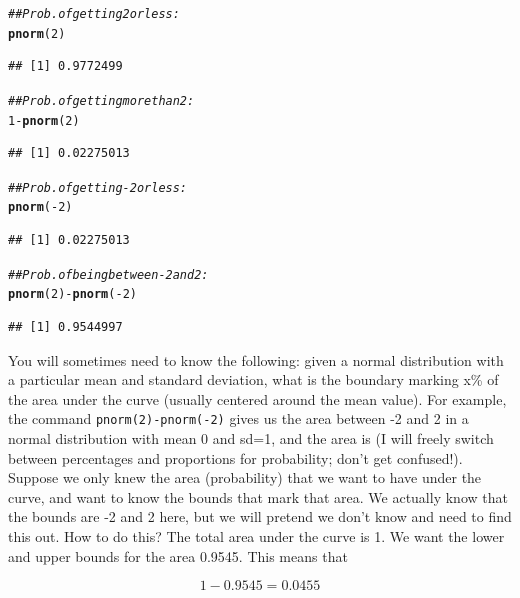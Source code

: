 \documentclass[12pt]{book}\usepackage[]{graphicx}\usepackage[]{color}
\makeatletter
\newcommand{\hlnum}[1]{\textcolor[rgb]{0.686,0.059,0.569}{#1}}%
\newcommand{\hlcom}[1]{\textcolor[rgb]{0.678,0.584,0.686}{\textit{#1}}}%
\newcommand{\hlopt}[1]{\textcolor[rgb]{0,0,0}{#1}}%
\newcommand{\hlstd}[1]{\textcolor[rgb]{0.345,0.345,0.345}{#1}}%
\newcommand{\hlkwd}[1]{\textcolor[rgb]{0.737,0.353,0.396}{\textbf{#1}}}%
\newenvironment{kframe}{%
 \def\at@end@of@kframe{}%
 \ifinner\ifhmode%
  \def\at@end@of@kframe{\end{minipage}}%
  \begin{minipage}{\columnwidth}%
 \fi\fi%
 \def\FrameCommand##1{\hskip\@totalleftmargin \hskip-\fboxsep
 \colorbox{shadecolor}{##1}\hskip-\fboxsep
     \hskip-\linewidth \hskip-\@totalleftmargin \hskip\columnwidth}%
 \MakeFramed {\advance\hsize-\width
   \@totalleftmargin\z@ \linewidth\hsize
   \@setminipage}}%
 {\par\unskip\endMakeFramed%
 \at@end@of@kframe}
\newenvironment{knitrout}{}{} %
\makeatother
\begin{document}
\begin{knitrout}
\color{fgcolor}\begin{kframe}
\begin{alltt}
\hlcom{## Prob. of getting 2 or less:}
\hlkwd{pnorm}\hlstd{(}\hlnum{2}\hlstd{)}
\end{alltt}
\begin{verbatim}
## [1] 0.9772499
\end{verbatim}
\begin{alltt}
\hlcom{## Prob. of getting more than 2:}
\hlnum{1}\hlopt{-}\hlkwd{pnorm}\hlstd{(}\hlnum{2}\hlstd{)}
\end{alltt}
\begin{verbatim}
## [1] 0.02275013
\end{verbatim}
\begin{alltt}
\hlcom{## Prob. of getting -2 or less:}
\hlkwd{pnorm}\hlstd{(}\hlopt{-}\hlnum{2}\hlstd{)}
\end{alltt}
\begin{verbatim}
## [1] 0.02275013
\end{verbatim}
\begin{alltt}
\hlcom{## Prob. of being between -2 and 2:}
\hlkwd{pnorm}\hlstd{(}\hlnum{2}\hlstd{)}\hlopt{-}\hlkwd{pnorm}\hlstd{(}\hlopt{-}\hlnum{2}\hlstd{)}
\end{alltt}
\begin{verbatim}
## [1] 0.9544997
\end{verbatim}
\end{kframe}
\end{knitrout}

You will sometimes need to know the following: given a normal distribution with a particular mean and standard deviation, what is the boundary marking x\% of the area under the curve (usually centered around the mean value). For example, 
the command \texttt{pnorm(2)-pnorm(-2)} gives us the area between -2 and 2 in a normal distribution with mean 0 and sd=1, and the area is  (I will freely switch between percentages and proportions for probability; don't get confused!). Suppose we only knew the area (probability) that we want to have under the curve, and want to know the bounds  that mark that area.
We actually know that the bounds are -2 and 2 here, but we will pretend we don't know and need to find this out.
How to do this?
The total area under the curve is 1. We want the lower and upper bounds for the area 
0.9545. This means that

\begin{equation}
1-0.9545= 0.0455
\end{equation}
\end{document}
